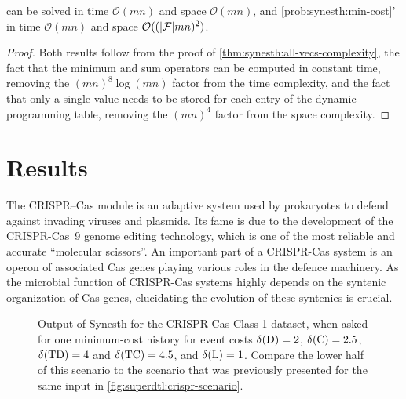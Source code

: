 \begin{theorem}
     can be solved
        in time \(\mathcal{O}(mn)\)
        and space \(\mathcal{O}(mn)\),
    and \cref*{prob:synesth:min-cost}'
        in time \(\mathcal{O}(mn)\)
        and space \(\mathcal{O}((|\mathcal{F}|mn)^2)\).
\end{theorem}
\begin{proof}
    Both results follow from the proof of \cref{thm:synesth:all-vecs-complexity}, the fact that the minimum and sum operators can be computed in constant time, removing the \((mn)^{8}\log(mn)\) factor from the time complexity, and the fact that only a single value needs to be stored for each entry of the dynamic programming table, removing the \((mn)^4\) factor from the space complexity.
\end{proof}

\section{Results}\label{sec:synesth:results}

The CRISPR–Cas module is an adaptive system used by prokaryotes to defend against invading viruses and plasmids. 
Its fame is due to the development of the CRISPR-Cas~9 genome editing technology, which is one of the most reliable and accurate “molecular scissors”. An important part of a CRISPR-Cas system is an operon of associated Cas genes playing various roles in the defence machinery. As the microbial function of CRISPR-Cas systems highly depends on the syntenic organization of Cas genes, elucidating the evolution of these syntenies is crucial.

\begin{figure}[h!]
    \capstart
    \centering%
    \scalebox{.82}{}
    \caption[Most parsimonious scenario for the CRISPR-Cas dataset under Synesth]{
        Output of Synesth for the CRISPR-Cas Class 1 dataset, when asked for one minimum-cost history for event costs \(\delta\kern.1pt(\mathrm{D}) = 2\), \(\delta\kern.1pt(\mathrm{C}) = 2.5\), \(\delta\kern.1pt(\mathrm{TD}) = 4\) and \(\delta\kern.1pt(\mathrm{TC}) = 4.5\), and \(\delta\kern.1pt(\mathrm{L}) = 1\).
        Compare the lower half of this scenario to the scenario that was previously presented for the same input in \cref{fig:superdtl:crispr-scenario}.
        \label{fig:synesth:crispr-sol}
    }
\end{figure}


